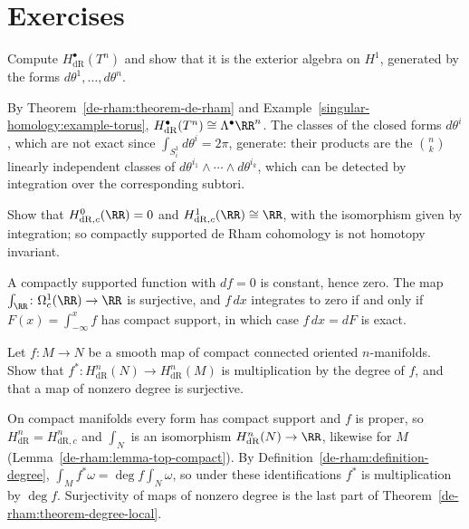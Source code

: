 \section{Exercises}\label{de-rham:section-exercises}

\begin{exercise}\label{de-rham:exercise-torus}
Compute $H^\bullet_{\mathrm{dR}}(T^n)$ and show that it is the exterior algebra on $H^1$, generated by the forms $d\theta^1, \ldots, d\theta^n$.
\end{exercise}

\begin{solution}
By Theorem~\ref{de-rham:theorem-de-rham} and Example~\ref{singular-homology:example-torus}, $H^\bullet_{\mathrm{dR}}(T^n) \cong \Lambda^\bullet\RR^n$. The classes of the closed forms $d\theta^i$, which are
not exact since $\int_{S^1_i}d\theta^i = 2\pi$, generate: their products are the $\binom{n}{k}$ linearly independent classes of $d\theta^{i_1} \wedge \cdots \wedge d\theta^{i_k}$, which can be detected by
integration over the corresponding subtori.
\end{solution}

\begin{exercise}\label{de-rham:exercise-compactly-supported-line}
Show that $H^0_{\mathrm{dR},c}(\RR) = 0$ and $H^1_{\mathrm{dR},c}(\RR) \cong \RR$, with the isomorphism given by integration; so compactly supported de Rham cohomology is not homotopy invariant.
\end{exercise}

\begin{solution}
A compactly supported function with $df = 0$ is constant, hence zero. The map $\int_\RR \colon \Omega^1_c(\RR) \to \RR$ is surjective, and $f\,dx$ integrates to zero if and only if $F(x) = \int_{-\infty}^xf$ has
compact support, in which case $f\,dx = dF$ is exact.
\end{solution}

\begin{exercise}\label{de-rham:exercise-degree-de-rham}
Let $f \colon M \to N$ be a smooth map of compact connected oriented $n$-manifolds. Show that $f^* \colon H^n_{\mathrm{dR}}(N) \to H^n_{\mathrm{dR}}(M)$ is multiplication by the degree of $f$, and that a map of
nonzero degree is surjective.
\end{exercise}

\begin{solution}
On compact manifolds every form has compact support and $f$ is proper, so $H^n_{\mathrm{dR}} = H^n_{\mathrm{dR},c}$ and $\int_N$ is an isomorphism $H^n_{\mathrm{dR}}(N) \to \RR$, likewise for $M$ (Lemma~\ref{de-rham:lemma-top-compact}). By
Definition~\ref{de-rham:definition-degree}, $\int_Mf^*\omega = \deg f\int_N\omega$, so under these identifications $f^*$ is multiplication by $\deg f$. Surjectivity of maps of nonzero degree is the last part of
Theorem~\ref{de-rham:theorem-degree-local}.
\end{solution}

